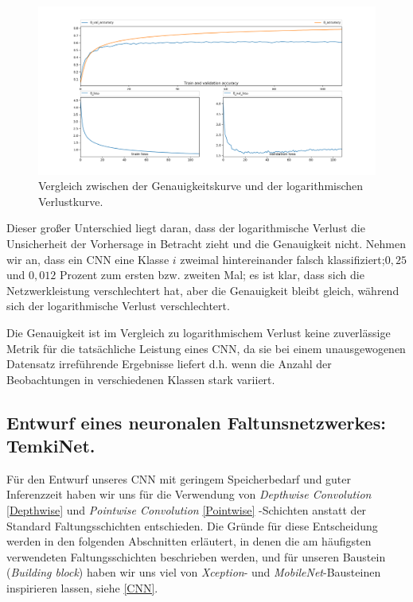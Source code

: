 \documentclass[12pt,a4paper]{scrartcl}
\numberwithin{equation}{section}
\begin{document}
\begin{figure}[h]
	\includegraphics[width=\textwidth]{accVSlogLoss}
	\caption{Vergleich zwischen der Genauigkeitskurve und der logarithmischen Verlustkurve. }
	\label{fig:accVSlogLoss}
\end{figure}

Dieser großer Unterschied liegt daran, dass der logarithmische Verlust die Unsicherheit der Vorhersage in Betracht zieht und die Genauigkeit nicht. Nehmen wir an, dass ein \ac{CNN} eine Klasse $ i $ zweimal hintereinander falsch klassifiziert;$ 0,25 $ und $ 0,012 $ Prozent zum ersten bzw. zweiten Mal; es ist klar, dass sich die Netzwerkleistung verschlechtert hat, aber die Genauigkeit bleibt gleich, während sich der logarithmische Verlust verschlechtert.

 Die Genauigkeit ist im Vergleich zu logarithmischem Verlust keine zuverlässige Metrik für die tatsächliche Leistung eines CNN, da sie bei einem unausgewogenen Datensatz irreführende Ergebnisse liefert d.h. wenn die Anzahl der Beobachtungen in verschiedenen Klassen stark variiert.

\subsection{Entwurf eines neuronalen Faltunsnetzwerkes: TemkiNet.}
Für den Entwurf unseres \ac{CNN} mit geringem Speicherbedarf und guter Inferenzzeit haben wir uns für die Verwendung von \textit{Depthwise Convolution} \ref{Depthwise} und \textit{Pointwise Convolution} \ref{Pointwise} -Schichten anstatt der Standard Faltungsschichten entschieden. Die Gründe für diese Entscheidung werden in den folgenden Abschnitten erläutert, in denen die am häufigsten verwendeten Faltungsschichten beschrieben werden, und für unseren Baustein (\textit{Building block}) haben wir uns viel von \textit{Xception}- und \textit{MobileNet}-Bausteinen inspirieren lassen, siehe \ref{CNN}. 
\end{document}
